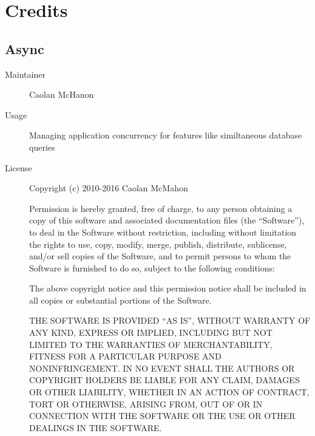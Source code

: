 \chapter{Credits}
  \section*{Async}
    \begin{description}
      \item[Maintainer] Caolan McHanon
      \item[Usage] Managing application concurrency for features like similtaneous database queries
      \item[License] \scriptsize Copyright (c) 2010-2016 Caolan McMahon

        Permission is hereby granted, free of charge, to any person obtaining a copy
        of this software and associated documentation files (the ``Software''), to deal
        in the Software without restriction, including without limitation the rights
        to use, copy, modify, merge, publish, distribute, sublicense, and/or sell
        copies of the Software, and to permit persons to whom the Software is
        furnished to do so, subject to the following conditions:

        The above copyright notice and this permission notice shall be included in
        all copies or substantial portions of the Software.

        THE SOFTWARE IS PROVIDED ``AS IS'', WITHOUT WARRANTY OF ANY KIND, EXPRESS OR
        IMPLIED, INCLUDING BUT NOT LIMITED TO THE WARRANTIES OF MERCHANTABILITY,
        FITNESS FOR A PARTICULAR PURPOSE AND NONINFRINGEMENT. IN NO EVENT SHALL THE
        AUTHORS OR COPYRIGHT HOLDERS BE LIABLE FOR ANY CLAIM, DAMAGES OR OTHER
        LIABILITY, WHETHER IN AN ACTION OF CONTRACT, TORT OR OTHERWISE, ARISING FROM,
        OUT OF OR IN CONNECTION WITH THE SOFTWARE OR THE USE OR OTHER DEALINGS IN
        THE SOFTWARE.
    \end{description}

